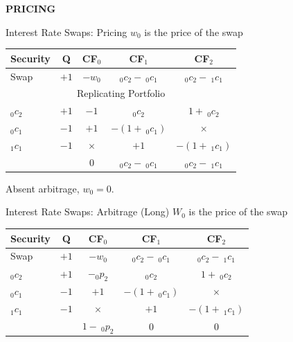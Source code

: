 \documentclass{beamer}
\begin{document}
\begin{frame}
    \begin{center}
        \textbf{PRICING}
    \end{center}
\end{frame}

\begin{frame}{Interest Rate Swaps: Pricing}
    $w_{0}$ is the price of the swap
    \begin{center}
        \begin{tabular}{lcccc}
            Security & Q & CF$_{0}$ & CF$_{1}$ & CF$_{2}$\\ \hline
            Swap & $+1$ & $-w_{0}$ & $_{0}c_{2}-\:_{0}c_{1}$ & $_{0}c_{2}-\:_{1}c_{1}$ \\ \hline
            \multicolumn{5}{c}{Replicating Portfolio} \\ \hline
            $_{0}c_{2}$ & $+1$ & $-1$ & $_{0}c_{2}$ & $1+\:_{0}c_{2}$ \\
            $_{0}c_{1}$ & $-1$ & $+1$ & $-(1+\:_{0}c_{1})$ & $\times$ \\
            $_{1}c_{1}$ & $-1$ & $\times$ & $+1$ & $-(1+\:_{1}c_{1})$\\ \hline
            & & $0$ & $_{0}c_{2}-\:_{0}c_{1}$ & $_{0}c_{2}-\:_{1}c_{1}$
        \end{tabular}
    \end{center}
    Absent arbitrage, $w_{0}=0$. 
\end{frame}

\iffalse

\begin{frame}{Interest Rate Swaps: Arbitrage (Long)}
    $W_{0}$ is the price of the swap
    \begin{center}
        \begin{tabular}{lcccc}
            Security & Q & CF$_{0}$ & CF$_{1}$ & CF$_{2}$\\ \hline
            Swap & $+1$ & $-w_{0}$ & $_{0}c_{2}-\:_{0}c_{1}$ & $_{0}c_{2}-\:_{1}c_{1}$ \\
            $_{0}c_{2}$ & $+1$ & $-_{0}p_{2}$ & $_{0}c_{2}$ & $1+\:_{0}c_{2}$ \\
            $_{0}c_{1}$ & $-1$ & $+1$ & $-(1+\:_{0}c_{1})$ & $\times$ \\
            $_{1}c_{1}$ & $-1$ & $\times$ & $+1$ & $-(1+\:_{1}c_{1})$ \\ \hline 
            & & $1-\:_{0}p_{2}$ & $0$ & $0$
        \end{tabular}
    \end{center}
\end{frame}
\end{document}
